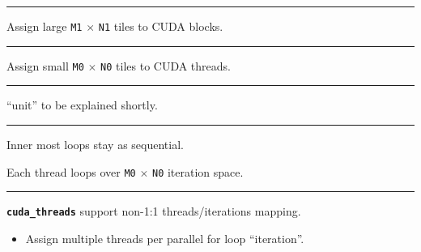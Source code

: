 \newpage
{}

{\large

}

\vspace{3mm}
\hrule

{\LARGE
Assign large \texttt{M1} $\times$ \texttt{N1} tiles to CUDA blocks.

}



\newpage
{}

{\large

}

\vspace{3mm}
\hrule

{\LARGE
Assign small \texttt{M0} $\times$ \texttt{N0} tiles to CUDA threads.

}

\newpage
{}

{\large

}

\vspace{3mm}
\hrule

{\LARGE
``unit'' to be explained shortly.

}

\newpage
{}

{\large

}

\vspace{3mm}
\hrule

{\LARGE
Inner most loops stay as sequential.

Each thread loops over \texttt{M0} $\times$ \texttt{N0} iteration space.

}

\newpage
{}

{\large

}

\vspace{3mm}
\hrule

{\LARGE
\texttt{\textbf{cuda\_threads}} support non-1:1 threads/iterations mapping.
\begin{itemize}
  \item Assign multiple threads per parallel for loop ``iteration''.
\end{itemize}

}

